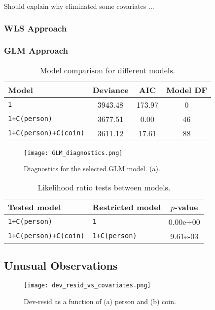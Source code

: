 \documentclass[a4paper, 12pt,oneside]{article}
\begin{document}
			Should explain why eliminated some covariates ...
			\subsubsection{WLS Approach}

			\subsubsection{GLM Approach}
			\lipsum[1]
			\begin{table}[htb]
				\centering
				\caption{Model comparison for different models.}
				\label{tab:model-comparison}
				\begin{tabular}{lccc}
				\toprule
				Model & Deviance & AIC & Model DF \\
				\midrule
				\texttt{1} & 3943.48 & 173.97 & 0 \\
				\texttt{1+C(person)} & 3677.51 & 0.00 & 46 \\
				\texttt{1+C(person)+C(coin)} & 3611.12 & 17.61 & 88 \\
				\bottomrule
				\end{tabular}
			\end{table}
			\lipsum[1]
			\begin{figure}[htb]
				\centering
				\texttt{[image: GLM\_diagnostics.png]}
				\caption{Diagnostics for the selected GLM model. (a).}
				\label{fig:glm-diagnostic}
			\end{figure}
			\lipsum[1]
			\begin{table}[htb]
				\centering
				\caption{Likelihood ratio tests between models.}
				\label{tab:llr-comparison}
				\begin{tabular}{llc}
				\toprule
				Tested model & Restricted model & $p$-value \\
				\midrule
				\texttt{1+C(person)} & \texttt{1} & 0.00e+00 \\
				\texttt{1+C(person)+C(coin)} & \texttt{1+C(person)} & 9.61e-03 \\
				\bottomrule
				\end{tabular}
			\end{table}
		\subsection{Unusual Observations}
		\begin{figure}[htb]
			\centering
			\texttt{[image: dev\_resid\_vs\_covariates.png]}
			\caption{Dev-resid as a function of (a) person and (b) coin.}
			\label{fig:dev-resid-vs-covariates}
		\end{figure}
\end{document}
